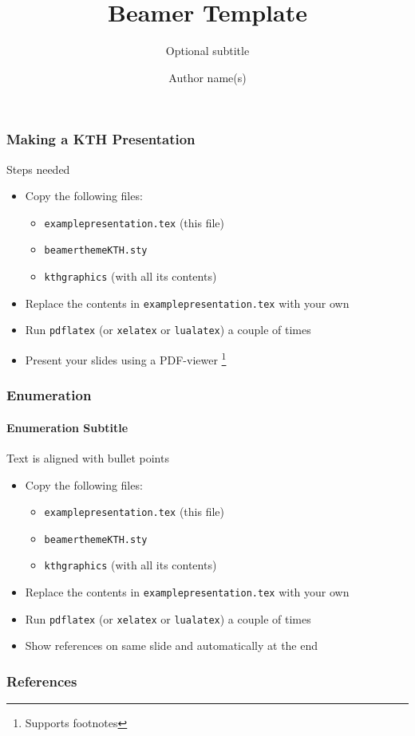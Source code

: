 \documentclass[aspectratio=169]{beamer}
\title{Beamer Template}
\subtitle{Optional subtitle}
\author[Short author]{Author name(s)}
\institute[Short Inst., Short Uni.]{Institute name, University name}
\begin{document}
\begin{frame}[plain] %
  \titlepage
\end{frame}

\begin{frame}
  \frametitle{Making a KTH Presentation}

  \begin{block}{Steps needed}
    \begin{itemize}
    \item Copy the following files:
    \begin{itemize}
    \item \texttt{examplepresentation.tex} (this file)
    \item \texttt{beamerthemeKTH.sty}
    \item \texttt{kthgraphics} (with all its contents)
    \end{itemize}
    \item Replace the contents in \texttt{examplepresentation.tex} with your own
    \item Run \texttt{pdflatex} (or \texttt{xelatex} or \texttt{lualatex}) a couple of times
    \item Present your slides using a PDF-viewer \footnote{Supports footnotes}
    \end{itemize}
  \end{block}

\end{frame}

\begin{frame}
  \frametitle{Enumeration}
  \framesubtitle{Enumeration Subtitle}
  Text is aligned with bullet points
  \begin{itemize}
    \item Copy the following files:
    \begin{itemize}
    \item \texttt{examplepresentation.tex} (this file) 
    \item \texttt{beamerthemeKTH.sty}
    \item \texttt{kthgraphics} (with all its contents)
    \end{itemize}
    \item Replace the contents in \texttt{examplepresentation.tex} with your own
    \item Run \texttt{pdflatex} (or \texttt{xelatex} or \texttt{lualatex}) a couple of times
    \item Show references on same slide  and automatically at the end

  \end{itemize}

\end{frame}

\begin{frame}[allowframebreaks]
  \frametitle{References}
  \printbibliography
\end{frame}
\end{document}
